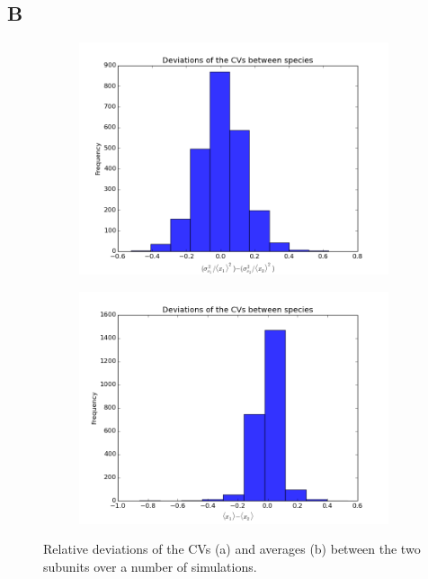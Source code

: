 \documentclass[a4paper,12pt]{article}
\begin{document}
\subsection*{B}
\begin{figure}[!ht]
        \centering
        \begin{subfigure}[!ht]{0.496\textwidth}
                \includegraphics[width=\textwidth]{images/vars_devs}
                \caption{}
                \label{fig:devs_vars}
        \end{subfigure}%
        
        \begin{subfigure}[b]{0.496\textwidth}
                \includegraphics[width=\textwidth]{images/avgs_devs}
                \caption{}
                \label{fig:devs_avgs}
        \end{subfigure}
        
\caption{Relative deviations of the CVs (a) and averages (b) between the two subunits over a number of simulations.}
\label{fig:dev_hists}
\end{figure}
\end{document}
